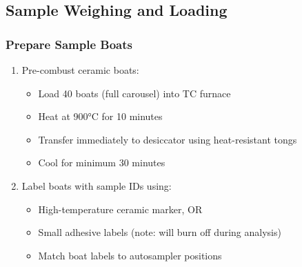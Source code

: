 \documentclass[11pt,a4paper]{article}\usepackage[]{graphicx}\usepackage[]{xcolor}
\begin{document}
\subsection{Sample Weighing and Loading}

\subsubsection{Prepare Sample Boats}
\begin{enumerate}[noitemsep]
    \item Pre-combust ceramic boats:
    \begin{itemize}
        \item Load 40 boats (full carousel) into TC furnace
        \item Heat at 900°C for 10 minutes
        \item Transfer immediately to desiccator using heat-resistant tongs
        \item Cool for minimum 30 minutes
    \end{itemize}
    \item Label boats with sample IDs using:
    \begin{itemize}
        \item High-temperature ceramic marker, OR
        \item Small adhesive labels (note: will burn off during analysis)
        \item Match boat labels to autosampler positions
    \end{itemize}
\end{enumerate}
\end{document}
